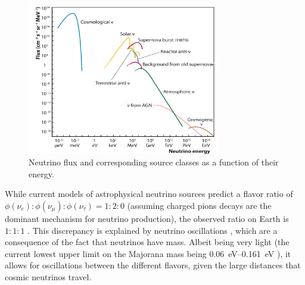 \begin{figure}
  \centering
  \includegraphics[width=0.75\textwidth]{content/img/neutrino_spectrum.png}
  \caption{
    Neutrino flux and corresponding source classes as a function of their energy.
    \cite{spiering2012} %
  }
  \label{fig:neutrinos:flux_spectrum}
\end{figure}


While current models of astrophysical neutrino sources predict a flavor ratio of
  $\phi(\nu_e) : \phi(\nu_\mu) : \phi(\nu_\tau) = 1 : 2 : 0$
    (assuming charged pions decays are the dominant mechanism for neutrino production),
the observed ratio on Earth is
  $1 : 1 : 1$ \cite{neutrinos_beacom}.
This discrepancy is explained by neutrino oscillations \cite{neutrinos_beacom},
  which are a consequence of the fact that neutrinos have mass.
Albeit being very light
  (the current lowest upper limit on the Majorana mass being \qtyrange{0.06}{0.161}{\electronvolt} \cite{neutrinos_gando}),
  it allows for oscillations between the different flavors,
    given the large distances that cosmic neutrinos travel.
